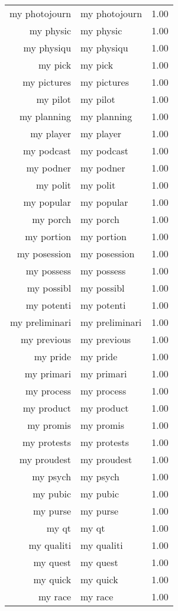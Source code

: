 \begin{table}[ht]
\begin{tabular}{rlr}
  my photojourn & my photojourn & 1.00 \\ 
  my physic & my physic & 1.00 \\ 
  my physiqu & my physiqu & 1.00 \\ 
  my pick & my pick & 1.00 \\ 
  my pictures & my pictures & 1.00 \\ 
  my pilot & my pilot & 1.00 \\ 
  my planning & my planning & 1.00 \\ 
  my player & my player & 1.00 \\ 
  my podcast & my podcast & 1.00 \\ 
  my podner & my podner & 1.00 \\ 
  my polit & my polit & 1.00 \\ 
  my popular & my popular & 1.00 \\ 
  my porch & my porch & 1.00 \\ 
  my portion & my portion & 1.00 \\ 
  my posession & my posession & 1.00 \\ 
  my possess & my possess & 1.00 \\ 
  my possibl & my possibl & 1.00 \\ 
  my potenti & my potenti & 1.00 \\ 
  my preliminari & my preliminari & 1.00 \\ 
  my previous & my previous & 1.00 \\ 
  my pride & my pride & 1.00 \\ 
  my primari & my primari & 1.00 \\ 
  my process & my process & 1.00 \\ 
  my product & my product & 1.00 \\ 
  my promis & my promis & 1.00 \\ 
  my protests & my protests & 1.00 \\ 
  my proudest & my proudest & 1.00 \\ 
  my psych & my psych & 1.00 \\ 
  my pubic & my pubic & 1.00 \\ 
  my purse & my purse & 1.00 \\ 
  my qt & my qt & 1.00 \\ 
  my qualiti & my qualiti & 1.00 \\ 
  my quest & my quest & 1.00 \\ 
  my quick & my quick & 1.00 \\ 
  my race & my race & 1.00 \\ 

\end{tabular}
\end{table}

